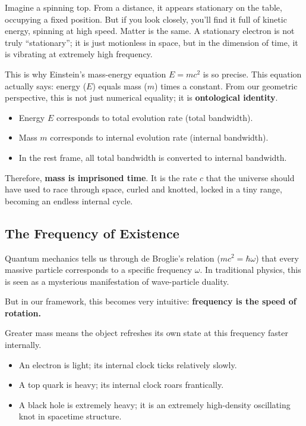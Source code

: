 Imagine a spinning top. From a distance, it appears stationary on the table, occupying a fixed position. But if you look closely, you'll find it full of kinetic energy, spinning at high speed. Matter is the same. A stationary electron is not truly ``stationary''; it is just motionless in space, but in the dimension of time, it is vibrating at extremely high frequency.

This is why Einstein's mass-energy equation $E=mc^2$ is so precise. This equation actually says: energy ($E$) equals mass ($m$) times a constant. From our geometric perspective, this is not just numerical equality; it is \textbf{ontological identity}.

\begin{itemize}
\item Energy $E$ corresponds to total evolution rate (total bandwidth).

\item Mass $m$ corresponds to internal evolution rate (internal bandwidth).

\item In the rest frame, all total bandwidth is converted to internal bandwidth.
\end{itemize}

Therefore, \textbf{mass is imprisoned time}. It is the rate $c$ that the universe should have used to race through space, curled and knotted, locked in a tiny range, becoming an endless internal cycle.

\subsection{The Frequency of Existence}

Quantum mechanics tells us through de Broglie's relation ($mc^2 = \hbar\omega$) that every massive particle corresponds to a specific frequency $\omega$. In traditional physics, this is seen as a mysterious manifestation of wave-particle duality.

But in our framework, this becomes very intuitive: \textbf{frequency is the speed of rotation.}

Greater mass means the object refreshes its own state at this frequency faster internally.

\begin{itemize}
\item An electron is light; its internal clock ticks relatively slowly.

\item A top quark is heavy; its internal clock roars frantically.

\item A black hole is extremely heavy; it is an extremely high-density oscillating knot in spacetime structure.
\end{itemize}

